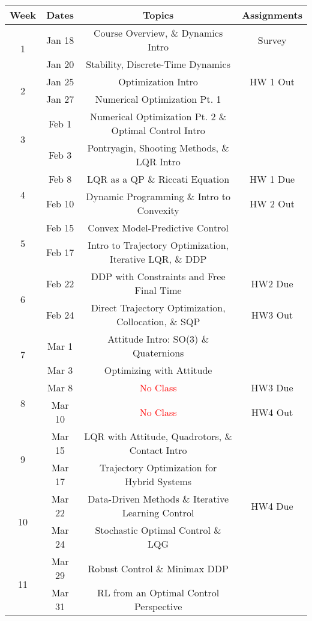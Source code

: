 \documentclass[11pt,letterpaper]{article}
\begin{document}
\begin{tabular}{c|c|c|c}
	Week & Dates & Topics & Assignments \\
	\hline
	\multirow{2}{*}{1} & Jan 18 & Course Overview, \& Dynamics Intro & Survey \\
	 & Jan 20 & Stability, Discrete-Time Dynamics &  \\
	\hline
	\multirow{2}{*}{2} & Jan 25 & Optimization Intro & HW 1 Out \\
	 & Jan 27 & Numerical Optimization Pt. 1 &  \\
	\hline
	\multirow{2}{*}{3}  & Feb 1 & Numerical Optimization Pt. 2 \& Optimal Control Intro &  \\
	 & Feb 3 & Pontryagin, Shooting Methods, \& LQR Intro &  \\
	\hline
	\multirow{2}{*}{4}  & Feb 8 & LQR as a QP \& Riccati Equation & HW 1 Due \\
	 & Feb 10 & Dynamic Programming \& Intro to Convexity  & HW 2 Out \\
	\hline
	\multirow{2}{*}{5}  & Feb 15 & Convex Model-Predictive Control & \\
	 & Feb 17 & Intro to Trajectory Optimization, Iterative LQR, \& DDP &  \\
	\hline
	\multirow{2}{*}{6}  & Feb 22 & DDP with Constraints and Free Final Time &   HW2 Due \\
	 & Feb 24 & Direct Trajectory Optimization, Collocation, \& SQP & HW3 Out \\
	\hline
	\multirow{2}{*}{7}  & Mar 1 & Attitude Intro: SO(3) \& Quaternions  & \\
	 & Mar 3 & Optimizing with Attitude & \\
	\hline
	\multirow{2}{*}{8}  & Mar 8 & \textcolor{red}{No Class} & HW3 Due\\
	 & Mar 10 & \textcolor{red}{No Class} & HW4 Out  \\
	\hline
	\multirow{2}{*}{9}  & Mar 15 & LQR with Attitude, Quadrotors, \& Contact Intro &  \\
	 & Mar 17 & Trajectory Optimization for Hybrid Systems &   \\
	\hline
	\multirow{2}{*}{10}  & Mar 22 & Data-Driven Methods \& Iterative Learning Control &  HW4 Due \\
	 & Mar 24 & Stochastic Optimal Control \& LQG &   \\
	 \hline
	\multirow{2}{*}{11}  & Mar 29 & Robust Control \& Minimax DDP &  \\
	 & Mar 31 & RL from an Optimal Control Perspective &   \\

\end{tabular}
\end{document}
